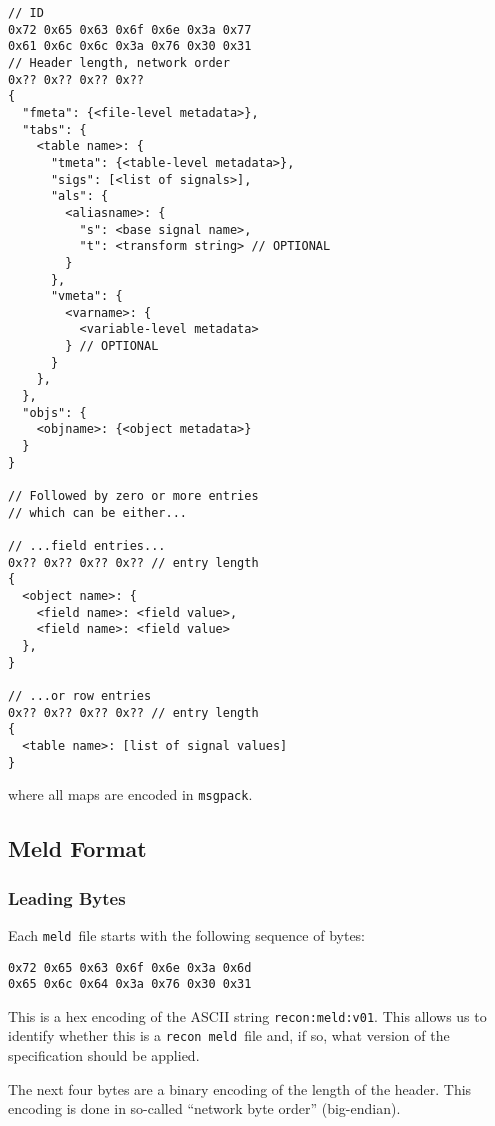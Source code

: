 \documentclass[11pt,a4paper,twocolumn]{article}
\newcommand{\recon}{\texttt{recon}}
\newcommand{\meld}{\texttt{meld}}
\newcommand{\msgpack}{\texttt{msgpack}}
\newcommand{\code}[1]{\texttt{#1}} %
\begin{document}
\begin{verbatim}
// ID
0x72 0x65 0x63 0x6f 0x6e 0x3a 0x77
0x61 0x6c 0x6c 0x3a 0x76 0x30 0x31
// Header length, network order
0x?? 0x?? 0x?? 0x??
{
  "fmeta": {<file-level metadata>},
  "tabs": {
    <table name>: {
      "tmeta": {<table-level metadata>},
      "sigs": [<list of signals>],
      "als": {
        <aliasname>: {
          "s": <base signal name>,
          "t": <transform string> // OPTIONAL
        }
      },
      "vmeta": {
        <varname>: {
          <variable-level metadata>
        } // OPTIONAL
      }
    },
  },
  "objs": {
    <objname>: {<object metadata>}
  }
}

// Followed by zero or more entries
// which can be either...

// ...field entries...
0x?? 0x?? 0x?? 0x?? // entry length
{
  <object name>: {
    <field name>: <field value>,
    <field name>: <field value>
  },
}

// ...or row entries
0x?? 0x?? 0x?? 0x?? // entry length
{
  <table name>: [list of signal values]
}
\end{verbatim}

where all maps are encoded in \msgpack.

\subsection{Meld Format}
\label{sec:meld_spec}

\subsubsection{Leading Bytes}

Each \meld\ file starts with the following sequence of bytes:

\begin{verbatim}
0x72 0x65 0x63 0x6f 0x6e 0x3a 0x6d
0x65 0x6c 0x64 0x3a 0x76 0x30 0x31
\end{verbatim}

This is a hex encoding of the ASCII string \code{recon:meld:v01}.
This allows us to identify whether this is a \recon\ \meld\ file and, if
so, what version of the specification should be applied.

The next four bytes are a binary encoding of the length of the header.
This encoding is done in so-called ``network byte order''
(big-endian).
\end{document}

